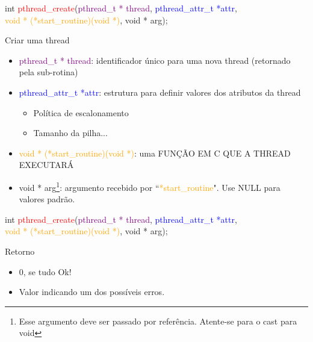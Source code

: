 \documentclass[10pt, xcolor=x11names]{beamer}
\begin{document}
\begin{frame}
	
int \textcolor{red}{pthread\_create}(\textcolor{purple}{pthread\_t * thread}, \textcolor{blue}{pthread\_attr\_t *attr},\\ \hspace{2.7cm} \textcolor{orange}{void * (*start\_routine)(void *)}, \textcolor[rgb]{.6,0,1}{void * arg});

	\begin{block}{Criar uma thread}
		\begin{itemize}[<+->]
			\item \textcolor{purple}{pthread\_t * thread}: identificador único para uma nova thread (retornado pela sub-rotina)
			\item \textcolor{blue}{pthread\_attr\_t *attr}: estrutura para definir valores dos atributos da thread
				\begin{itemize}
					\item Política de escalonamento
					\item Tamanho da pilha...
				\end{itemize}
			\item \textcolor{orange}{void * (*start\_routine)(void *)}: uma FUNÇÃO EM C QUE A THREAD EXECUTARÁ
			\item \textcolor[rgb]{.6,0,1}{void * arg}\footnote{Esse argumento deve ser passado por referência. Atente-se para o cast para void}: argumento recebido por ``\textcolor{orange}{*start\_routine}". Use NULL para valores padrão.
		\end{itemize}
	\end{block}
\end{frame}


\begin{frame}
	
int \textcolor{red}{pthread\_create}(\textcolor{purple}{pthread\_t * thread}, \textcolor{blue}{pthread\_attr\_t *attr},\\ \hspace{2.7cm} \textcolor{orange}{void * (*start\_routine)(void *)}, \textcolor[rgb]{.6,0,1}{void * arg});

	\begin{block}{Retorno}
		\begin{itemize}
			\item 0, se tudo Ok!
			\item Valor indicando um dos possíveis erros.
		\end{itemize}
	\end{block}

\end{frame}
\end{document}
